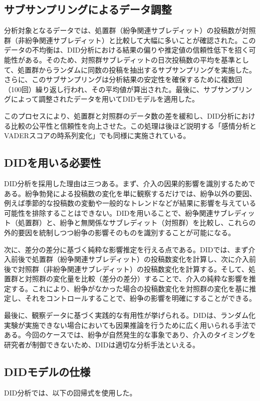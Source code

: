 \documentclass[11pt, a4j]{jreport}
\begin{document}
    \subsection{サブサンプリングによるデータ調整}
    分析対象となるデータでは、処置群（紛争関連サブレディット）の投稿数が対照群（非紛争関連サブレディット）と比較して大幅に多いことが確認された。このデータの不均衡は、DID分析における結果の偏りや推定値の信頼性低下を招く可能性がある。そのため、対照群サブレディットの日次投稿数の平均を基準として、処置群からランダムに同数の投稿を抽出するサブサンプリングを実施した。さらに、このサブサンプリングは分析結果の安定性を確保するために複数回（100回）繰り返し行われ、その平均値が算出された。最後に、サブサンプリングによって調整されたデータを用いてDIDモデルを適用した。

    このプロセスにより、処置群と対照群のデータ数の差を緩和し、DID分析における比較の公平性と信頼性を向上させた。この処理は後ほど説明する「感情分析とVADERスコアの時系列変化」でも同様に実施されている。

    \subsection{DIDを用いる必要性}
    DID分析を採用した理由は三つある。まず、介入の因果的影響を識別するためである。紛争勃発による投稿数の変化を単に観察するだけでは、紛争以外の要因、例えば季節的な投稿数の変動や一般的なトレンドなどが結果に影響を与えている可能性を排除することはできない。DIDを用いることで、紛争関連サブレディット（処置群）と、紛争と無関係なサブレディット（対照群）を比較し、これらの外的要因を統制しつつ紛争の影響そのものを識別することが可能になる。
    
    次に、差分の差分に基づく純粋な影響推定を行える点である。DIDでは、まず介入前後で処置群（紛争関連サブレディット）の投稿数変化を計算し、次に介入前後で対照群（非紛争関連サブレディット）の投稿数変化を計算する。そして、処置群と対照群の変化量を比較（差分の差分）することで、介入の純粋な影響を推定する。これにより、紛争がなかった場合の投稿数変化を対照群の変化を基に推定し、それをコントロールすることで、紛争の影響を明確にすることができる。
    
    最後に、観察データに基づく実践的な有用性が挙げられる。DIDは、ランダム化実験が実施できない場合においても因果推論を行うために広く用いられる手法である。今回のケースでは、紛争が自然発生的な事象であり、介入のタイミングを研究者が制御できないため、DIDは適切な分析手法といえる。

    \subsection{DIDモデルの仕様}
    DID分析では、以下の回帰式を使用した。
\end{document}
